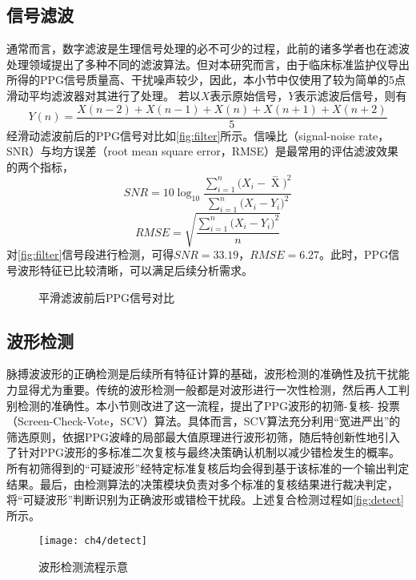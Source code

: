 \subsection{信号滤波}
通常而言，数字滤波是生理信号处理的必不可少的过程，此前的诸多学者也在滤波处理领域提出了多种不同的滤波算法。但对本研究而言，由于临床标准监护仪导出所得的PPG信号质量高、干扰噪声较少，因此，本小节中仅使用了较为简单的5点滑动平均滤波器对其进行了处理。
若以$X$表示原始信号，$Y$表示滤波后信号，则有
\begin{equation}
    \label{equ:filter}
    Y(n)=\frac{X(n-2)+X(n-1)+X(n)+X(n+1)+X(n+2)}{5}
\end{equation}
经滑动滤波前后的PPG信号对比如\autoref{fig:filter}所示。信噪比（signal-noise rate，SNR）与均方误差（root mean square error，RMSE）是最常用的评估滤波效果的两个指标，
\begin{equation}
    \label{equ:snr}
    SNR=10\log_{10}\frac{\sum_{i=1}^{n}{(X_i-\mathop{X} \limits^-})^2}{\sum_{i=1}^{n}{(X_i-Y_i})^2}
\end{equation}
\begin{equation}
    \label{equ:rmse}
    RMSE=\sqrt{\frac{\sum_{i=1}^{n}{(X_i-Y_i})^2}{n}}
\end{equation}
对\autoref{fig:filter}信号段进行检测，可得$SNR=33.19$，$RMSE=6.27$。此时，PPG信号波形特征已比较清晰，可以满足后续分析需求。
\begin{figure}[htbp]
    \centering
    \quad
    \caption{\label{fig:filter}平滑滤波前后PPG信号对比}
\end{figure}

\subsection{波形检测}
脉搏波波形的正确检测是后续所有特征计算的基础，波形检测的准确性及抗干扰能力显得尤为重要。传统的波形检测一般都是对波形进行一次性检测，然后再人工判别检测的准确性。本小节则改进了这一流程，提出了PPG波形的初筛-复核-
投票（Screen-Check-Vote，SCV）算法。具体而言，SCV算法充分利用“宽进严出”的筛选原则，依据PPG波峰的局部最大值原理进行波形初筛，随后特创新性地引入了针对PPG波形的多标准二次复核与最终决策确认机制以减少错检发生的概率。
所有初筛得到的“可疑波形”经特定标准复核后均会得到基于该标准的一个输出判定结果。最后，由检测算法的决策模块负责对多个标准的复核结果进行裁决判定，将“可疑波形”判断识别为正确波形或错检干扰段。上述复合检测过程如\autoref{fig:detect}所示。
\begin{figure}[htbp]
    \centering
    \texttt{[image: ch4/detect]}
    \caption{\label{fig:detect}波形检测流程示意}
\end{figure}

